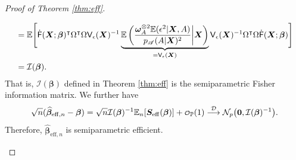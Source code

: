 \documentclass[11pt]{article}
\numberwithin{equation}{section}
\theoremstyle{definition}
\theoremstyle{remark}
\newcommand{\bS}{\bm{S}}
\newcommand{\bX}{\bm{X}}
\newcommand{\bbeta}{\bm{\beta}}
\newcommand{\bomega}{\bm{\omega}}
\newcommand{\bbE}{\mathbb{E}}
\newcommand{\bbP}{\mathbb{P}}
\newcommand{\cD}{\mathcal{D}}
\newcommand{\cI}{\mathcal{I}}
\newcommand{\cN}{\mathcal{N}}
\newcommand{\sA}{\mathscr{A}}
\newcommand{\sfF}{\mathsf{F}}
\newcommand{\sfV}{\mathsf{V}}
\newcommand\smallcO{
	\mathchoice
	{{\scriptstyle\mathcal{O}}}%
	{{\scriptstyle\mathcal{O}}}%
	{{\scriptscriptstyle\mathcal{O}}}%
	{\scalebox{.5}{$\scriptscriptstyle\mathcal{O}$}}%
}
\newcommand{\bzero}{\mathbf{0}}	%
\newcommand{\eff}{\mathrm{eff}}
\begin{document}
\begin{proof}[Proof of Theorem \ref{thm:eff}]
\begin{enumerate}[label=\textbf{Step \Roman*:},leftmargin=0cm]
\begin{align*}
			&=\bbE\Bigg[ \dot{\sfF}(\bX;\bbeta)^{\intercal}\Omega^{\intercal}\Omega\sfV_{\epsilon}(\bX)^{-1}\underbrace{\bbE\left(  {\bomega_{A}^{\otimes 2}\bbE(\epsilon^{2}|\bX,A) \over p_{\sA}(A|\bX)^{2}}\middle|\bX \right)}_{= \sfV_{\epsilon}(\bX)} \sfV_{\epsilon}(\bX)^{-1}\Omega^{\intercal}\Omega\dot{\sfF}(\bX;\bbeta) \Bigg]\\
			&= \cI(\bbeta).
		\end{align*}
		That is, $ \cI(\bbeta) $ defined in Theorem \ref{thm:eff} is the semiparametric Fisher information matrix. We further have
		\[ \sqrt{n}(\widehat{\bbeta}_{\eff,n}-\bbeta) = \sqrt{n}\cI(\bbeta)^{-1}\bbE_{n}[\bS_{\eff}(\bbeta)] + \smallcO_{\bbP}(1) \stackrel{\cD}{\longrightarrow} \cN_{p}\big(\bzero, \cI(\bbeta)^{-1} \big). \]
		Therefore, $ \widehat{\bbeta}_{\eff,n} $ is semiparametric efficient.
	\end{enumerate}
\end{proof}
\end{document}
